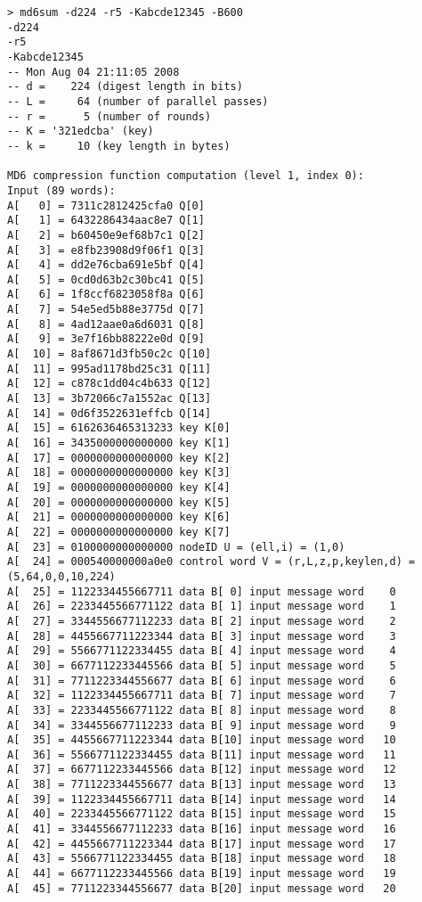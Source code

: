 \begin{verbatim}
> md6sum -d224 -r5 -Kabcde12345 -B600
-d224
-r5
-Kabcde12345
-- Mon Aug 04 21:11:05 2008
-- d =    224 (digest length in bits)
-- L =     64 (number of parallel passes)
-- r =      5 (number of rounds)
-- K = '321edcba' (key)
-- k =     10 (key length in bytes)

MD6 compression function computation (level 1, index 0):
Input (89 words):
A[   0] = 7311c2812425cfa0 Q[0]
A[   1] = 6432286434aac8e7 Q[1]
A[   2] = b60450e9ef68b7c1 Q[2]
A[   3] = e8fb23908d9f06f1 Q[3]
A[   4] = dd2e76cba691e5bf Q[4]
A[   5] = 0cd0d63b2c30bc41 Q[5]
A[   6] = 1f8ccf6823058f8a Q[6]
A[   7] = 54e5ed5b88e3775d Q[7]
A[   8] = 4ad12aae0a6d6031 Q[8]
A[   9] = 3e7f16bb88222e0d Q[9]
A[  10] = 8af8671d3fb50c2c Q[10]
A[  11] = 995ad1178bd25c31 Q[11]
A[  12] = c878c1dd04c4b633 Q[12]
A[  13] = 3b72066c7a1552ac Q[13]
A[  14] = 0d6f3522631effcb Q[14]
A[  15] = 6162636465313233 key K[0]
A[  16] = 3435000000000000 key K[1]
A[  17] = 0000000000000000 key K[2]
A[  18] = 0000000000000000 key K[3]
A[  19] = 0000000000000000 key K[4]
A[  20] = 0000000000000000 key K[5]
A[  21] = 0000000000000000 key K[6]
A[  22] = 0000000000000000 key K[7]
A[  23] = 0100000000000000 nodeID U = (ell,i) = (1,0)
A[  24] = 000540000000a0e0 control word V = (r,L,z,p,keylen,d) = (5,64,0,0,10,224)
A[  25] = 1122334455667711 data B[ 0] input message word    0
A[  26] = 2233445566771122 data B[ 1] input message word    1
A[  27] = 3344556677112233 data B[ 2] input message word    2
A[  28] = 4455667711223344 data B[ 3] input message word    3
A[  29] = 5566771122334455 data B[ 4] input message word    4
A[  30] = 6677112233445566 data B[ 5] input message word    5
A[  31] = 7711223344556677 data B[ 6] input message word    6
A[  32] = 1122334455667711 data B[ 7] input message word    7
A[  33] = 2233445566771122 data B[ 8] input message word    8
A[  34] = 3344556677112233 data B[ 9] input message word    9
A[  35] = 4455667711223344 data B[10] input message word   10
A[  36] = 5566771122334455 data B[11] input message word   11
A[  37] = 6677112233445566 data B[12] input message word   12
A[  38] = 7711223344556677 data B[13] input message word   13
A[  39] = 1122334455667711 data B[14] input message word   14
A[  40] = 2233445566771122 data B[15] input message word   15
A[  41] = 3344556677112233 data B[16] input message word   16
A[  42] = 4455667711223344 data B[17] input message word   17
A[  43] = 5566771122334455 data B[18] input message word   18
A[  44] = 6677112233445566 data B[19] input message word   19
A[  45] = 7711223344556677 data B[20] input message word   20

\end{verbatim}
